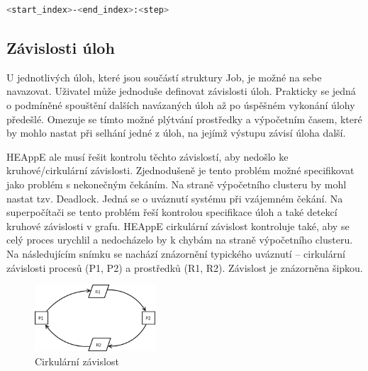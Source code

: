 \begin{lstlisting}[language=bash,caption={Struktura definice JobArrays}]
                            <start_index>-<end_index>:<step>
\end{lstlisting}

\subsection{Závislosti úloh}
U jednotlivých úloh, které jsou součástí struktury Job, je možné na sebe navazovat. Uživatel může jednoduše definovat závislosti úloh. Prakticky se jedná o podmíněné spouštění dalších navázaných úloh až po úspěšném vykonání úlohy předešlé. Omezuje se tímto možné plýtvání prostředky a výpočetním časem, které by mohlo nastat při selhání jedné z úloh, na jejímž výstupu závisí úloha další.

HEAppE ale musí řešit kontrolu těchto závislostí, aby nedošlo ke kruhové/cirkulární závislosti. Zjednodušeně je tento problém možné specifikovat jako problém s nekonečným čekáním. Na straně výpočetního clusteru by mohl nastat tzv. Deadlock. Jedná se o uváznutí systému při vzájemném čekání. Na superpočítači se tento problém řeší kontrolou specifikace úloh a také detekcí kruhové závislosti v grafu. HEAppE cirkulární závislost kontroluje také, aby se celý proces urychlil a nedocházelo by k chybám na straně výpočetního clusteru. Na následujícím snímku se nachází znázornění typického uváznutí – cirkulární závislosti procesů (P1, P2) a prostředků (R1, R2). Závislost je znázorněna šipkou.


\begin{figure}
	\centering
	\includegraphics[width=0.4\textwidth]{Figures/Process_deadlock.png}
	\caption{Cirkulární závislost \cite{OvBwjLleECKerU0E}}
	\label{fig:cirkularni-zavislost}
\end{figure}

\newpage
